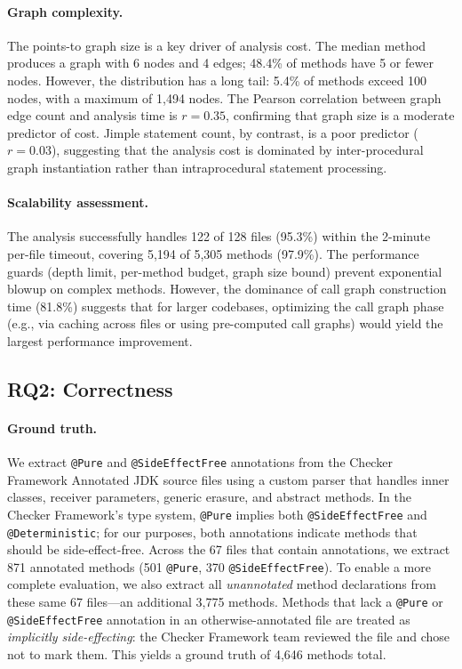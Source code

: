 \paragraph{Graph complexity.}
The points-to graph size is a key driver of analysis cost.
The median method produces a graph with 6 nodes and 4 edges; 48.4\% of methods have 5 or fewer nodes.
However, the distribution has a long tail: 5.4\% of methods exceed 100 nodes, with a maximum of 1,494 nodes.
The Pearson correlation between graph edge count and analysis time is $r = 0.35$, confirming that graph size is a moderate predictor of cost.
Jimple statement count, by contrast, is a poor predictor ($r = 0.03$), suggesting that the analysis cost is dominated by inter-procedural graph instantiation rather than intraprocedural statement processing.

\paragraph{Scalability assessment.}
The analysis successfully handles 122 of 128 files (95.3\%) within the 2-minute per-file timeout, covering 5,194 of 5,305 methods (97.9\%).
The performance guards (depth limit, per-method budget, graph size bound) prevent exponential blowup on complex methods.
However, the dominance of call graph construction time (81.8\%) suggests that for larger codebases, optimizing the call graph phase (e.g., via caching across files or using pre-computed call graphs) would yield the largest performance improvement.


\subsection{RQ2: Correctness}


\paragraph{Ground truth.}
We extract \texttt{@Pure} and \texttt{@SideEffectFree} annotations from the Checker Framework Annotated JDK source files using a custom parser that handles inner classes, receiver parameters, generic erasure, and abstract methods.
In the Checker Framework's type system, \texttt{@Pure} implies both \texttt{@SideEffectFree} and \texttt{@Deterministic}; for our purposes, both annotations indicate methods that should be side-effect-free.
Across the 67 files that contain annotations, we extract 871 annotated methods (501 \texttt{@Pure}, 370 \texttt{@SideEffectFree}).
To enable a more complete evaluation, we also extract all \emph{unannotated} method declarations from these same 67 files---an additional 3,775 methods.
Methods that lack a \texttt{@Pure} or \texttt{@SideEffectFree} annotation in an otherwise-annotated file are treated as \emph{implicitly side-effecting}: the Checker Framework team reviewed the file and chose not to mark them.
This yields a ground truth of 4,646 methods total.


